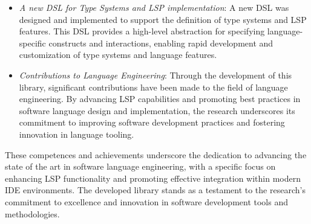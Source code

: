 \documentclass{adapt-lab}
\begin{document}
\begin{itemize}
    \item \textit{A new DSL for Type Systems and LSP implementation}: A new DSL was designed and implemented to support the definition of type systems and LSP features. This DSL provides a high-level abstraction for specifying language-specific constructs and interactions, enabling rapid development and customization of type systems and language features.
    \item \textit{Contributions to Language Engineering}: Through the development of this library, significant contributions have been made to the field of language engineering. By advancing LSP capabilities and promoting best practices in software language design and implementation, the research underscores its commitment to improving software development practices and fostering innovation in language tooling.
\end{itemize}

These competences and achievements underscore the dedication to advancing the state of the art in software language engineering, with a specific focus on enhancing LSP functionality and promoting effective integration within modern IDE environments. The developed library stands as a testament to the research's commitment to excellence and innovation in software development tools and methodologies.

\begingroup
\let\clearpage\relax


\endgroup

\nocite{Cazzola20}
\nocite{Cazzola21b, Cazzola15f}
\nocite{Leduc20}
\nocite{Cazzola15c, Cazzola14c}
\nocite{Cazzola15f, Cazzola21b}
\nocite{Fowler10}
\nocite{Bettini13b}
\nocite{Barros22}
\nocite{Bunder19a}
\nocite{Rodriguez-Echeverria18a}
\nocite{Cazzola20}
\nocite{Rodriguez-Echeverria18}
\nocite{Cazzola23d, Cazzola20}
\nocite{Cazzola15f}
\nocite{Cazzola15f}
\nocite{Cazzola16, Cazzola16i, Cazzola15f}
\nocite{Haugen08, Cazzola14e, White09}
\nocite{Wende09}
\nocite{Cazzola15c, Cazzola14c}
\nocite{Cazzola19}

%
% 
% 
\end{document}
